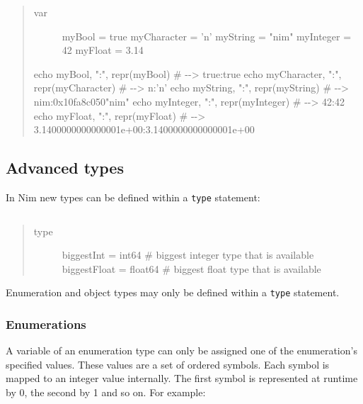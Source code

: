 \begin{verbatim}
\end{verbatim}

\begin{quote}
\begin{description}
\item[var]
myBool = true myCharacter = 'n' myString = "nim" myInteger = 42 myFloat
= 3.14
\end{description}

echo myBool, ":", repr(myBool) \# -\/-\textgreater{} true:true echo
myCharacter, ":", repr(myCharacter) \# -\/-\textgreater{} n:'n' echo
myString, ":", repr(myString) \# -\/-\textgreater{} nim:0x10fa8c050"nim"
echo myInteger, ":", repr(myInteger) \# -\/-\textgreater{} 42:42 echo
myFloat, ":", repr(myFloat) \# -\/-\textgreater{}
3.1400000000000001e+00:3.1400000000000001e+00
\end{quote}

\hypertarget{advanced-types}{%
\subsection{Advanced types}\label{advanced-types}}

In Nim new types can be defined within a \texttt{type} statement:

\begin{verbatim}
\end{verbatim}

\begin{quote}
\begin{description}
\item[type]
biggestInt = int64 \# biggest integer type that is available
biggestFloat = float64 \# biggest float type that is available
\end{description}
\end{quote}

Enumeration and object types may only be defined within a \texttt{type}
statement.

\hypertarget{enumerations}{%
\subsubsection{Enumerations}\label{enumerations}}

A variable of an enumeration type can only be assigned one of the
enumeration's specified values. These values are a set of ordered
symbols. Each symbol is mapped to an integer value internally. The first
symbol is represented at runtime by 0, the second by 1 and so on. For
example:

